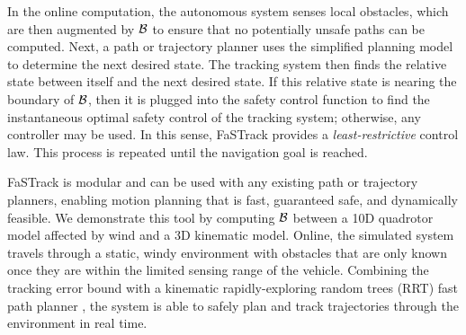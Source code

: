In the online computation, the autonomous system senses local obstacles, which are then augmented by $\mathcal B$ to ensure that no potentially unsafe paths can be computed. Next, a path or trajectory planner uses the simplified planning model to determine the next desired state. The tracking system then finds the relative state between itself and the next desired state. If this relative state is nearing the boundary of $\mathcal B$, then it is plugged into the safety control function to find the instantaneous optimal safety control of the tracking system; otherwise, any controller may be used. In this sense, FaSTrack provides a \emph{least-restrictive} control law. This process is repeated until the navigation goal is reached. 
  

%
FaSTrack is modular and can be used with any existing path or trajectory planners, enabling motion planning that is fast, guaranteed safe, and dynamically feasible. We demonstrate this tool by computing $\mathcal B$ between a 10D quadrotor model affected by wind and a 3D kinematic model. Online, the simulated system travels through a static, windy environment with obstacles that are only known once they are within the limited sensing range of the vehicle. Combining the tracking error bound with a kinematic rapidly-exploring random trees (RRT) fast path planner \cite{Kuffner2000, Kavraki1996}, the system is able to safely plan and track trajectories through the environment in real time.